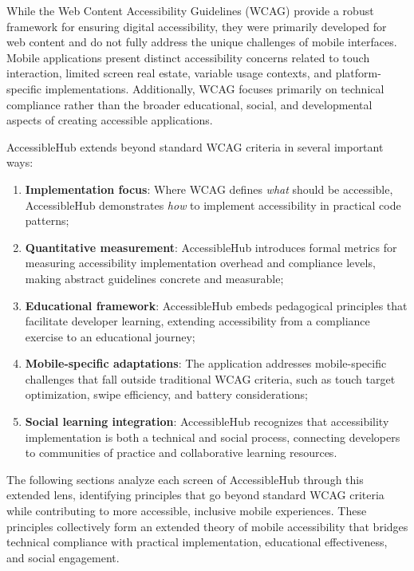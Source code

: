 While the Web Content Accessibility Guidelines (WCAG) provide a robust framework for ensuring digital accessibility, they were primarily developed for web content and do not fully address the unique challenges of mobile interfaces. Mobile applications present distinct accessibility concerns related to touch interaction, limited screen real estate, variable usage contexts, and platform-specific implementations. Additionally, WCAG focuses primarily on technical compliance rather than the broader educational, social, and developmental aspects of creating accessible applications.

AccessibleHub extends beyond standard WCAG criteria in several important ways:

\begin{enumerate}
    \item \textbf{Implementation focus}: Where WCAG defines \textit{what} should be accessible, AccessibleHub demonstrates \textit{how} to implement accessibility in practical code patterns;
    
    \item \textbf{Quantitative measurement}: AccessibleHub introduces formal metrics for measuring accessibility implementation overhead and compliance levels, making abstract guidelines concrete and measurable;
    
    \item \textbf{Educational framework}: AccessibleHub embeds pedagogical principles that facilitate developer learning, extending accessibility from a compliance exercise to an educational journey;
    
    \item \textbf{Mobile-specific adaptations}: The application addresses mobile-specific challenges that fall outside traditional WCAG criteria, such as touch target optimization, swipe efficiency, and battery considerations;
    
    \item \textbf{Social learning integration}: AccessibleHub recognizes that accessibility implementation is both a technical and social process, connecting developers to communities of practice and collaborative learning resources.
\end{enumerate}

The following sections analyze each screen of AccessibleHub through this extended lens, identifying principles that go beyond standard WCAG criteria while contributing to more accessible, inclusive mobile experiences. These principles collectively form an extended theory of mobile accessibility that bridges technical compliance with practical implementation, educational effectiveness, and social engagement.

